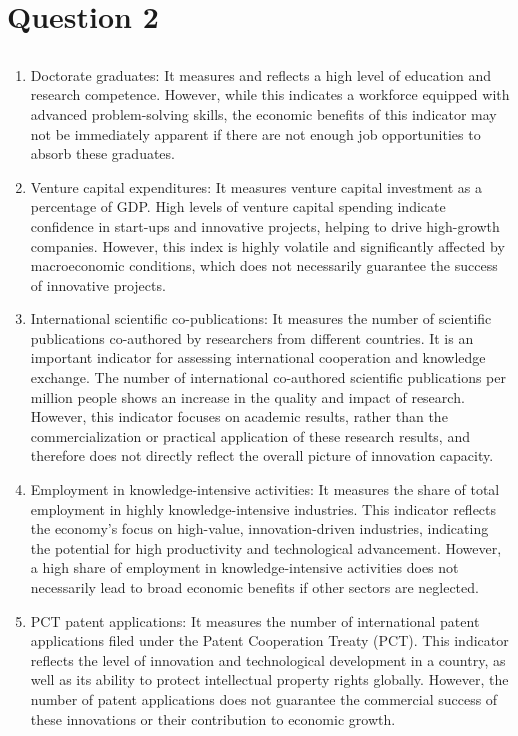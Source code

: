 \documentclass[UTF8,a4paper,AutoFakeBold,AutoFakeSlant]{article}
\begin{document}
\section{Question 2}

\subsection{}

\begin{enumerate}
    \item Doctorate graduates: It measures and reflects a high level of education and research competence. However, while this indicates a workforce equipped with advanced problem-solving skills, the economic benefits of this indicator may not be immediately apparent if there are not enough job opportunities to absorb these graduates.
    \item Venture capital expenditures: It measures venture capital investment as a percentage of GDP. High levels of venture capital spending indicate confidence in start-ups and innovative projects, helping to drive high-growth companies. However, this index is highly volatile and significantly affected by macroeconomic conditions, which does not necessarily guarantee the success of innovative projects.
    \item International scientific co-publications: It measures the number of scientific publications co-authored by researchers from different countries. It is an important indicator for assessing international cooperation and knowledge exchange. The number of international co-authored scientific publications per million people shows an increase in the quality and impact of research. However, this indicator focuses on academic results, rather than the commercialization or practical application of these research results, and therefore does not directly reflect the overall picture of innovation capacity.
    \item Employment in knowledge-intensive activities: It measures the share of total employment in highly knowledge-intensive industries. This indicator reflects the economy's focus on high-value, innovation-driven industries, indicating the potential for high productivity and technological advancement. However, a high share of employment in knowledge-intensive activities does not necessarily lead to broad economic benefits if other sectors are neglected.
    \item PCT patent applications: It measures the number of international patent applications filed under the Patent Cooperation Treaty (PCT). This indicator reflects the level of innovation and technological development in a country, as well as its ability to protect intellectual property rights globally. However, the number of patent applications does not guarantee the commercial success of these innovations or their contribution to economic growth.
\end{enumerate}
\end{document}
